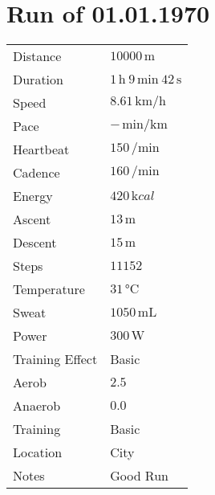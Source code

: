 \documentclass[20pt, a5paper]{article}
\begin{document}
\section*{Run of 01.01.1970}

\begin{center}
\begin{tabularx}{0.5\linewidth}{l l}
Distance & $10000 \,\unit{\meter}$\\
Duration & $1 \,\unit{\hour}~ 9 \,\unit{\minute}~ 42 \,\unit{\second}$\\
Speed & $8.61 \,\unit{\kilo\meter\per\hour}$\\
Pace & $- \,\unit{\minute\per\kilo\meter}$\\
Heartbeat & $150 \,\unit{\per\minute}$\\
Cadence & $160 \,\unit{\per\minute}$\\
Energy & $420 \,\unit{\kilo cal}$\\
Ascent & $13 \,\unit{\meter}$\\
Descent & $15 \,\unit{\meter}$\\
Steps & $11152$\\
Temperature & $31 \,\unit{\degreeCelsius}$\\
Sweat & $1050 \,\unit{\milli\liter}$\\
Power & $300 \,\unit{\watt}$\\
Training Effect & Basic\\
Aerob & $2.5$\\
Anaerob & $0.0$\\
Training & Basic\\
Location & City\\
Notes & Good Run
\end{tabularx}
\end{center}
\end{document}
